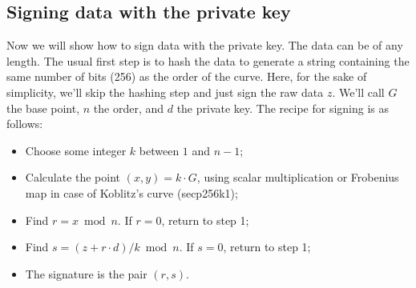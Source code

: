 \documentclass{article}
\begin{document}
\subsection*{Signing data with the private key}
Now we will show how to sign data with the private key.\newline
The data can be of any length. The usual first step is to hash the data to generate a string containing the same number of bits (256) as the order of the curve. Here, for the sake of simplicity, we’ll skip the hashing step and just sign the raw data \(z\). We’ll call \(G\) the base point, \(n\) the order, and \(d\) the private key. The recipe for signing is as follows:
\begin{itemize}
    \item Choose some integer \(k\) between \(1\) and \(n - 1\);
    \item Calculate the point \((x,y) = k \cdot G\), using scalar multiplication or Frobenius map in case of Koblitz’s curve (secp256k1);
    \item Find \(r = x \bmod n\). If \(r = 0\), return to step 1;
    \item Find \(s = ( z + r \cdot d)/k \bmod n\). If \(s = 0\), return to step 1;
    \item The signature is the pair \((r, s)\).
\end{itemize}
\end{document}
